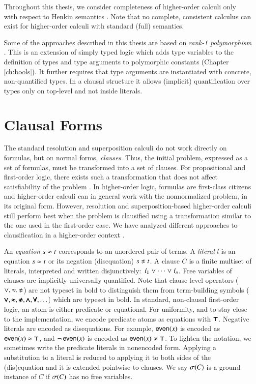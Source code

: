 Throughout this thesis, we consider completeness of higher-order calculi only
with respect to Henkin semantics \cite{bm-14-automation-ho}. Note that no
complete, consistent calculus can exist for higher-order calculi with standard (full)
semantics.

Some of the approaches described in this thesis are based on {\em rank-1
polymorphism} \cite{bp-13-tff1,ksr-16-th1}. This is an extension of simply typed
logic which adds type variables to the definition of types and type arguments to
polymorphic constants (Chapter \ref{ch:bools}). It further
requires that type arguments are instantiated with concrete, non-quantified
types. In a clausal structure it allows (implicit)
quantification over types only on top-level and not inside literals.

\section{Clausal Forms}
\label{sec:pre:clauses}

The standard resolution and superposition calculi do not work directly on formulas, but
on normal forms, {\em clauses}. Thus, the initial problem, expressed as a
set of formulas, must be transformed into a set of clauses. For propositional
and first-order logic, there exists such a transformation that does not affect
satisfiability of the problem \cite{nw-01-small-cnf}. In higher-order logic,
formulas are first-class citizens and higher-order calculi can in general work
with the nonnormalized problem, in its original form. However, resolution and
superposition-based higher-order calculi still perform best when the problem is clausified
using a transformation similar to the one used in the first-order case. We have analyzed
different approaches to clausification in a higher-order context \cite{bbtv-21-full-ho-sup}.

An {\em equation} $s \approx t$ corresponds to an unordered pair of terms. A {\em
literal} $l$ is an equation $s \approx t$ or its negation (disequation) $s \noteq
t$. A clause $C$ is a finite multiset of literals, interpreted and written
disjunctively:\ $l_1 \mathrel\lor \cdots \mathrel\lor l_n$. Free variables of clauses are
implicitly universally quantified. Note that clause-level operators ($\llor, \eq, \noteq$) are not typeset in bold
to distinguish them from term-building symbols ($\pmb{\lor}, \pmb{\approx}, \pmb{\not\approx}, \pmb{\land}, \pmb{\forall}, \ldots$) which are typeset in bold. In standard,
non-clausal first-order logic, an atom is either predicate or equational. For
uniformity, and to stay close to the implementation, we encode predicate atoms
as equations with $\pmb{\top}$. Negative literals are encoded as disequations. For
example, $\mathsf{even}(x)$ is encoded as $\mathsf{even}(x) \approx \pmb{\top}$, and
$\neg\,\mathsf{even}(x)$ is encoded as $\mathsf{even}(x) \not\approx \pmb{\top}$. To lighten the
notation, we sometimes write the predicate literals in nonencoded form.
Applying a substitution to a literal is reduced to applying it to both sides of
the (dis)equa\-tion and it is extended pointwise to clauses. We say
$\sigma(C)$ is a ground instance of $C$ if $\sigma(C)$ has no free variables.
\pagebreak[2]

